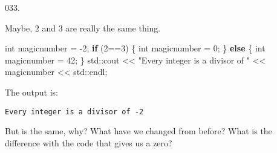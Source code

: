 \documentclass[]{book}
\newenvironment{Shaded}{}{}
\newcommand{\BuiltInTok}[1]{#1}
\newcommand{\ControlFlowTok}[1]{\textcolor[rgb]{0.00,0.44,0.13}{\textbf{#1}}}
\newcommand{\DataTypeTok}[1]{\textcolor[rgb]{0.56,0.13,0.00}{#1}}
\newcommand{\DecValTok}[1]{\textcolor[rgb]{0.25,0.63,0.44}{#1}}
\newcommand{\NormalTok}[1]{#1}
\newcommand{\StringTok}[1]{\textcolor[rgb]{0.25,0.44,0.63}{#1}}
\begin{document}
\begin{minipage}{\linewidth}\noindent
{\tiny 033.}\\
\begin{minipage}[t]{.485\linewidth}

Maybe, \(2\) and \(3\) are really the same thing.

\begin{framed}

\begin{Shaded}
\begin{Highlighting}[]
\DataTypeTok{int}\NormalTok{ magicnumber = }\DecValTok{-2}\NormalTok{;}
\ControlFlowTok{if}\NormalTok{ (}\DecValTok{2}\NormalTok{==}\DecValTok{3}\NormalTok{) \{}
  \DataTypeTok{int}\NormalTok{ magicnumber = }\DecValTok{0}\NormalTok{;}
\NormalTok{\} }\ControlFlowTok{else}\NormalTok{ \{}
  \DataTypeTok{int}\NormalTok{ magicnumber = }\DecValTok{42}\NormalTok{;}
\NormalTok{\}}
\BuiltInTok{std::}\NormalTok{cout << }\StringTok{"Every integer is a divisor of "}
\NormalTok{          << magicnumber << }\BuiltInTok{std::}\NormalTok{endl;}
\end{Highlighting}
\end{Shaded}

\end{framed}

\end{minipage}
\hfill
\begin{minipage}[t]{.485\linewidth}

The output is:

\begin{framed}

\begin{verbatim}
Every integer is a divisor of -2
\end{verbatim}

\end{framed}

But is the same, why? What have we changed from before? What is the
difference with the code that gives us a zero?

\end{minipage}
\end{minipage}

\vspace{2mm}\noindent\hrulefill{}
\end{document}
